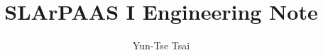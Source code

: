 \documentclass[letterpaper,11pt]{article}
\title{SLArPAAS I Engineering Note}
\author{Yun-Tse Tsai}
\begin{document}
\maketitle
\tableofcontents











\clearpage
\begin{appendices}

% 


\clearpage


\clearpage


% 

% 

\clearpage


\clearpage


\clearpage


\clearpage


\clearpage


\clearpage


% 
% 
% 
% 

\end{appendices}
\end{document}
